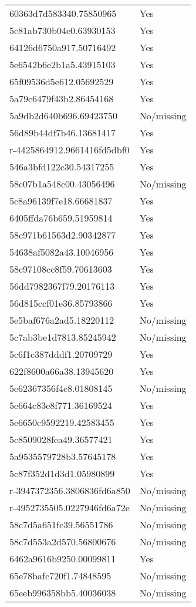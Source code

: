 \begin{tabular}{ll}
60363d7d583340.75850965 & Yes \\
5c81ab730b04e0.63930153 & Yes \\
64126d6750a917.50716492 & Yes \\
5e6542b6e2b1a5.43915103 & Yes \\
65f09536d5e612.05692529 & Yes \\
5a79c6479f43b2.86454168 & Yes \\
5a9db2d640b696.69423750 & No/missing \\
56d89b44df7b46.13681417 & Yes \\
r-4425864912.9661416fd5dbf0 & Yes \\
546a3bfd122c30.54317255 & Yes \\
58c07b1a548c00.43056496 & No/missing \\
5c8a96139f7e18.66681837 & Yes \\
6405ffda76b659.51959814 & Yes \\
58c971b61563d2.90342877 & Yes \\
54638af5082a43.10046956 & Yes \\
58c97108cc8f59.70613603 & Yes \\
56dd7982367f79.20176113 & Yes \\
56d815ccf01e36.85793866 & Yes \\
5e5baf676a2ad5.18220112 & No/missing \\
5c7ab3be1d7813.85245942 & No/missing \\
5c6f1c387dddf1.20709729 & Yes \\
622f8600a66a38.13945620 & Yes \\
5e62367356f4c8.01808145 & No/missing \\
5e664c83e8f771.36169524 & Yes \\
5e6650c9592219.42583455 & Yes \\
5c8509028fea49.36577421 & Yes \\
5a9535579728b3.57645178 & Yes \\
5c87f352d1d3d1.05980899 & Yes \\
r-3947372356.3806836fd6a850 & No/missing \\
r-4952735505.0227946fd6a72e & No/missing \\
58c7d5a651fc39.56551786 & No/missing \\
58c7d553a2d570.56800676 & No/missing \\
6462a9616b9250.00099811 & Yes \\
65e78bafc720f1.74848595 & No/missing \\
65eeb996358bb5.40036038 & No/missing \\

\end{tabular}
